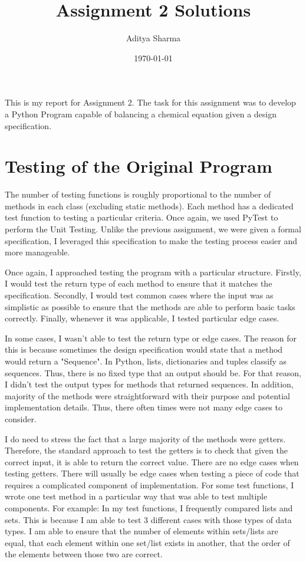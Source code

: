 \documentclass[12pt]{article}
\title{Assignment 2 Solutions}
\author{Aditya Sharma}
\date{\today}
\begin{document}
\maketitle

This is my report for Assignment 2. The task for this assignment was to develop a Python Program capable of balancing a chemical equation given a design specification.

\section{Testing of the Original Program}
The number of testing functions is roughly proportional to the number of methods in each class (excluding static methods).
Each method has a dedicated test function to testing a particular criteria. Once again, we used
PyTest to perform the Unit Testing. Unlike the previous assignment, we were given a formal specification,
I leveraged this specification to make the testing process easier and more manageable.

Once again, I approached testing the program with a particular structure. Firstly, I would test the return type of each method
to ensure that it matches the specification. Secondly, I would test common cases where the input was as simplistic as possible
to ensure that the methods are able to perform basic tasks correctly. Finally, whenever it was applicable, I tested particular 
edge cases.

In some cases, I wasn't able to test the return type or edge cases. The reason for this is because sometimes the design specification
would state that a method would return a "Sequence". In Python, lists, dictionaries and tuples classify as sequences. Thus,
there is no fixed type that an output should be. For that reason, I didn't test the output types for methods that returned sequences.
In addition, majority of the methods were straightforward with their purpose and potential implementation details. Thus, there often times
were not many edge cases to consider.

I do need to stress the fact that a large majority of the methods were getters. Therefore, the standard approach to test the getters 
is to check that given the correct input, it is able to return the correct value. There are no edge cases when testing getters. There will usually be edge cases
when testing a piece of code that requires a complicated component of implementation. For some test functions, I wrote one test method in a particular way that was able 
to test multiple components. For example: In my test functions, I frequently compared lists and sets. This is because I am able to test 3 different cases with those types of data types.
I am able to ensure that the number of elements within sets/lists are equal, that each element within one set/list exists in another, that the order of the elements between those two are correct.
\end{document}
